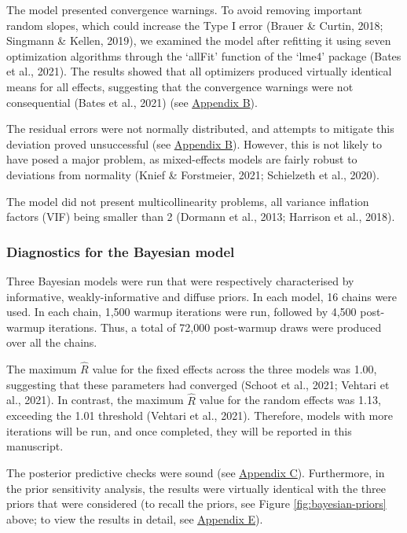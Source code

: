 \documentclass[
  12pt,
  man,floatsintext]{apa7}
\begin{document}
The model presented convergence warnings. To avoid removing important random slopes, which could increase the Type I error (Brauer \& Curtin, 2018; Singmann \& Kellen, 2019), we examined the model after refitting it using seven optimization algorithms through the `allFit' function of the `lme4' package (Bates et al., 2021). The results showed that all optimizers produced virtually identical means for all effects, suggesting that the convergence warnings were not consequential (Bates et al., 2021) (see \protect\hyperlink{appendix-B-frequentist-analysis-diagnostics}{\underline{Appendix B}}).

The residual errors were not normally distributed, and attempts to mitigate this deviation proved unsuccessful (see \protect\hyperlink{appendix-B-frequentist-analysis-diagnostics}{\underline{Appendix B}}). However, this is not likely to have posed a major problem, as mixed-effects models are fairly robust to deviations from normality (Knief \& Forstmeier, 2021; Schielzeth et al., 2020).

The model did not present multicollinearity problems, all variance inflation factors (VIF) being smaller than 2 (Dormann et al., 2013; Harrison et al., 2018).

\hypertarget{diagnostics-for-the-bayesian-model}{%
\subsubsection{Diagnostics for the Bayesian model}\label{diagnostics-for-the-bayesian-model}}

Three Bayesian models were run that were respectively characterised by informative, weakly-informative and diffuse priors. In each model, 16 chains were used. In each chain, 1,500 warmup iterations were run, followed by 4,500 post-warmup iterations. Thus, a total of 72,000 post-warmup draws were produced over all the chains.

The maximum \(\widehat R\) value for the fixed effects across the three models was 1.00, suggesting that these parameters had converged (Schoot et al., 2021; Vehtari et al., 2021). In contrast, the maximum \(\widehat R\) value for the random effects was 1.13, exceeding the 1.01 threshold (Vehtari et al., 2021). Therefore, models with more iterations will be run, and once completed, they will be reported in this manuscript.

The posterior predictive checks were sound (see \protect\hyperlink{appendix-C-Bayesian-analysis-diagnostics}{\underline{Appendix C}}). Furthermore, in the prior sensitivity analysis, the results were virtually identical with the three priors that were considered (to recall the priors, see Figure \ref{fig:bayesian-priors} above; to view the results in detail, see \protect\hyperlink{appendix-E-Bayesian-analysis-results}{\underline{Appendix E}}).
\end{document}
